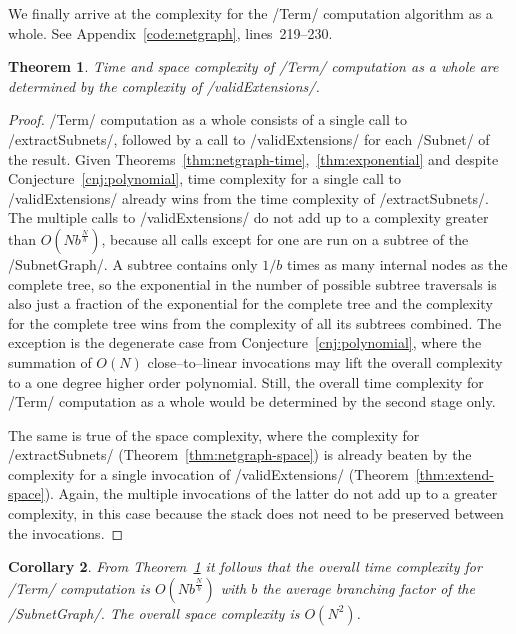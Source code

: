 \documentclass[12pt,a4paper]{article}
\newtheorem{theorem}{Theorem}
\newtheorem{corollary}[theorem]{Corollary}
\begin{document}
We finally arrive at the complexity for the \hs/Term/ computation algorithm as a whole. See Appendix~\ref{code:netgraph}, lines~219--230.
\begin{theorem}\label{thm:deciding-complexity}
    Time and space complexity of \hs/Term/ computation as a whole are determined by the complexity of \hs/validExtensions/.
\end{theorem}
\begin{proof}
    \hs/Term/ computation as a whole consists of a single call to \hs/extractSubnets/, followed by a call to \hs/validExtensions/ for each \hs/Subnet/ of the result. Given Theorems~\ref{thm:netgraph-time},~\ref{thm:exponential} and despite Conjecture~\ref{cnj:polynomial}, time complexity for a single call to \hs/validExtensions/ already wins from the time complexity of \hs/extractSubnets/. The multiple calls to \hs/validExtensions/ do not add up to a complexity greater than $O(Nb^{\frac{N}{b}})$, because all calls except for one are run on a subtree of the \hs/SubnetGraph/. A subtree contains only $1/b$ times as many internal nodes as the complete tree, so the exponential in the number of possible subtree traversals is also just a fraction of the exponential for the complete tree and the complexity for the complete tree wins from the complexity of all its subtrees combined. The exception is the degenerate case from Conjecture~\ref{cnj:polynomial}, where the summation of $O(N)$ close--to--linear invocations may lift the overall complexity to a one degree higher order polynomial. Still, the overall time complexity for \hs/Term/ computation as a whole would be determined by the second stage only.
    
    The same is true of the space complexity, where the complexity for \hs/extractSubnets/ (Theorem~\ref{thm:netgraph-space}) is already beaten by the complexity for a single invocation of \hs/validExtensions/ (Theorem~\ref{thm:extend-space}). Again, the multiple invocations of the latter do not add up to a greater complexity, in this case because the stack does not need to be preserved between the invocations.
\end{proof}

\begin{corollary}
    From Theorem~\ref{thm:deciding-complexity} it follows that the overall time complexity for \hs/Term/ computation is $O(Nb^{\frac{N}{b}})$ with $b$ the average branching factor of the \hs/SubnetGraph/. The overall space complexity is $O(N^2)$.
\end{corollary}
\end{document}
